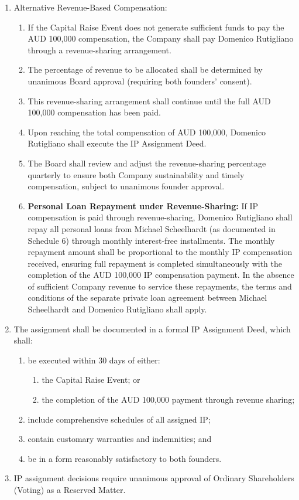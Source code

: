 \begin{enumerate}[label=(\alph*)]
\item Alternative Revenue-Based Compensation:
    \begin{enumerate}[label=(\roman*)]
    \item If the Capital Raise Event does not generate sufficient funds to pay the AUD 100,000 compensation, the Company shall pay Domenico Rutigliano through a revenue-sharing arrangement.
    \item The percentage of revenue to be allocated shall be determined by unanimous Board approval (requiring both founders' consent).
    \item This revenue-sharing arrangement shall continue until the full AUD 100,000 compensation has been paid.
    \item Upon reaching the total compensation of AUD 100,000, Domenico Rutigliano shall execute the IP Assignment Deed.
    \item The Board shall review and adjust the revenue-sharing percentage quarterly to ensure both Company sustainability and timely compensation, subject to unanimous founder approval.
    \item \textbf{Personal Loan Repayment under Revenue-Sharing:} If IP compensation is paid through revenue-sharing, Domenico Rutigliano shall repay all personal loans from Michael Scheelhardt (as documented in Schedule 6) through monthly interest-free installments. The monthly repayment amount shall be proportional to the monthly IP compensation received, ensuring full repayment is completed simultaneously with the completion of the AUD 100,000 IP compensation payment. In the absence of sufficient Company revenue to service these repayments, the terms and conditions of the separate private loan agreement between Michael Scheelhardt and Domenico Rutigliano shall apply.
    \end{enumerate}

\item The assignment shall be documented in a formal IP Assignment Deed, which shall:
    \begin{enumerate}[label=(\roman*)]
    \item be executed within 30 days of either:
        \begin{enumerate}[label=(a)]
        \item the Capital Raise Event; or
        \item the completion of the AUD 100,000 payment through revenue sharing;
        \end{enumerate}
    \item include comprehensive schedules of all assigned IP;
    \item contain customary warranties and indemnities; and
    \item be in a form reasonably satisfactory to both founders.
    \end{enumerate}

\item IP assignment decisions require unanimous approval of Ordinary Shareholders (Voting) as a Reserved Matter.
\end{enumerate}

